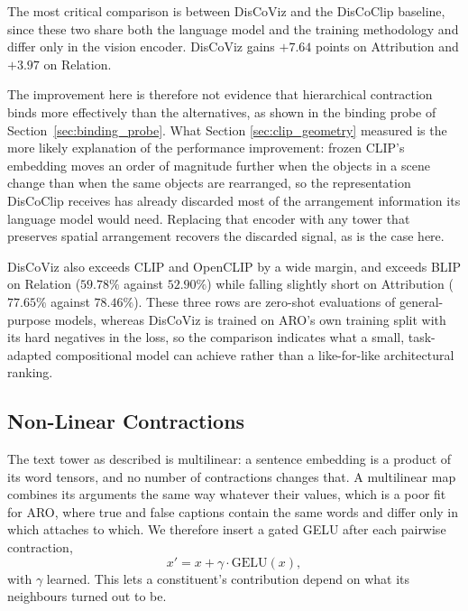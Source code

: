\documentclass[12pt, a4paper, oneside]{report}
\begin{document}
The most critical comparison is between DisCoViz and the DisCoClip baseline, since these two share both the language model and the training methodology and differ only in the vision encoder. DisCoViz gains $+7.64$ points on Attribution and $+3.97$ on Relation.

The improvement here is therefore not evidence that hierarchical contraction binds more effectively than the alternatives, as shown in the binding probe of Section~\ref{sec:binding_probe}. What Section \ref{sec:clip_geometry} measured is the more likely explanation of the performance improvement: frozen CLIP's embedding moves an order of magnitude further when the objects in a scene change than when the same objects are rearranged, so the representation DisCoClip receives has already discarded most of the arrangement information its language model would need. Replacing that encoder with any tower that preserves spatial arrangement recovers the discarded signal, as is the case here.

DisCoViz also exceeds CLIP and OpenCLIP by a wide margin, and exceeds BLIP on Relation ($59.78\%$ against $52.90\%$) while falling slightly short on Attribution ($77.65\%$ against $78.46\%$). These three rows are zero-shot evaluations of general-purpose models, whereas DisCoViz is trained on ARO's own training split with its hard negatives in the loss, so the comparison indicates what a small, task-adapted compositional model can achieve rather than a like-for-like architectural ranking.

\subsection{Non-Linear Contractions}
The text tower as described is multilinear: a sentence embedding is a product of its word tensors, and no number of contractions changes that. A multilinear map combines its arguments the same way whatever their values, which is a poor fit for ARO, where true and false captions contain the same words and differ only in which attaches to which. We therefore insert a gated GELU after each pairwise contraction,
\begin{equation}
    x' = x + \gamma \cdot \mathrm{GELU}(x),
\end{equation}
with $\gamma$ learned. This lets a constituent's contribution depend on what its neighbours turned out to be.
\end{document}
